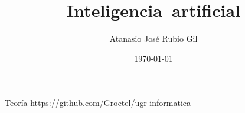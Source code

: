 \documentclass[10pt]{report}
\author{Atanasio José Rubio Gil}
\title{Inteligencia\ artificial}
\date{\today}
\begin{document}
            {Teoría}
            {https://github.com/Groctel/ugr-informatica}
\tableofcontents


% 
\end{document}

